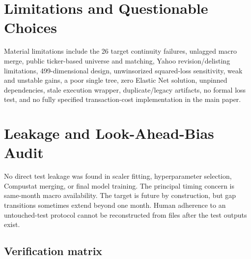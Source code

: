 \documentclass[
  11pt,
  a4paper]{article}
\begin{document}
\section{Limitations and Questionable Choices}\label{sec-15}

Material limitations include the 26 target continuity failures, unlagged
macro merge, public ticker-based universe and matching, Yahoo
revision/delisting limitations, 499-dimensional design, unwinsorized
squared-loss sensitivity, weak and unstable gains, a poor single tree,
zero Elastic Net solution, unpinned dependencies, stale execution
wrapper, duplicate/legacy artifacts, no formal loss test, and no fully
specified transaction-cost implementation in the main paper.

\section{Leakage and Look-Ahead-Bias Audit}\label{sec-16}

No direct test leakage was found in scaler fitting, hyperparameter
selection, Compustat merging, or final model training. The principal
timing concern is same-month macro availability. The target is future by
construction, but gap transitions sometimes extend beyond one month.
Human adherence to an untouched-test protocol cannot be reconstructed
from files after the test outputs exist.

\subsection{Verification matrix}\label{sec-verification-matrix}
\end{document}
